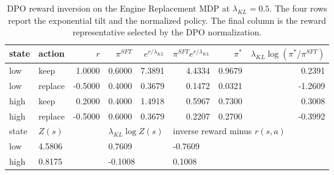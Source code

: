\begin{table}[H]
\centering
\small
\caption{DPO reward inversion on the Engine Replacement MDP at $\lambda_{KL}=0.5$. The four rows report the exponential tilt and the normalized policy. The final column is the reward representative selected by the DPO normalization.}
\label{tab:engine_preferences}
\begin{tabular}{llrrrrrr}
\hline
state & action & $r$ & $\pi^{SFT}$ & $e^{r/\lambda_{KL}}$ & $\pi^{SFT}e^{r/\lambda_{KL}}$ & $\pi^*$ & $\lambda_{KL}\log(\pi^*/\pi^{SFT})$ \\
\hline
low & keep & 1.0000 & 0.6000 & 7.3891 & 4.4334 & 0.9679 & 0.2391 \\
low & replace & -0.5000 & 0.4000 & 0.3679 & 0.1472 & 0.0321 & -1.2609 \\
high & keep & 0.2000 & 0.4000 & 1.4918 & 0.5967 & 0.7300 & 0.3008 \\
high & replace & -0.5000 & 0.6000 & 0.3679 & 0.2207 & 0.2700 & -0.3992 \\
\hline
state & \multicolumn{2}{l}{$Z(s)$} & \multicolumn{2}{l}{$\lambda_{KL}\log Z(s)$} & \multicolumn{3}{l}{inverse reward minus $r(s,a)$} \\
\hline
low & \multicolumn{2}{l}{4.5806} & \multicolumn{2}{l}{0.7609} & \multicolumn{3}{l}{-0.7609} \\
high & \multicolumn{2}{l}{0.8175} & \multicolumn{2}{l}{-0.1008} & \multicolumn{3}{l}{0.1008} \\
\hline
\end{tabular}
\end{table}
